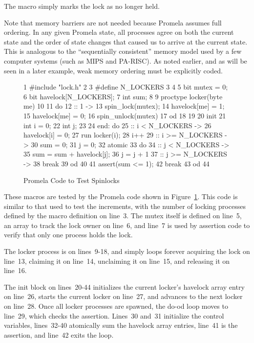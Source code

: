 The  macro simply marks the lock as no
longer held.

Note that memory barriers are not needed because Promela assumes
full ordering.
In any given Promela state, all processes agree on both the current
state and the order of state changes that caused us to arrive at
the current state.
This is analogous to the ``sequentially consistent'' memory model
used by a few computer systems (such as MIPS and PA-RISC).
As noted earlier, and as will be seen in a later example,
weak memory ordering must be explicitly coded.

\begin{figure}[tb]
{ \scriptsize
\begin{verbbox}
  1 #include "lock.h"
  2
  3 #define N_LOCKERS 3
  4
  5 bit mutex = 0;
  6 bit havelock[N_LOCKERS];
  7 int sum;
  8
  9 proctype locker(byte me)
 10 {
 11   do
 12   :: 1 ->
 13     spin_lock(mutex);
 14     havelock[me] = 1;
 15     havelock[me] = 0;
 16     spin_unlock(mutex)
 17   od
 18 }
 19
 20 init {
 21   int i = 0;
 22   int j;
 23
 24 end:  do
 25   :: i < N_LOCKERS ->
 26     havelock[i] = 0;
 27     run locker(i);
 28     i++
 29   :: i >= N_LOCKERS ->
 30     sum = 0;
 31     j = 0;
 32     atomic {
 33       do
 34       :: j < N_LOCKERS ->
 35         sum = sum + havelock[j];
 36         j = j + 1
 37       :: j >= N_LOCKERS ->
 38         break
 39       od
 40     }
 41     assert(sum <= 1);
 42     break
 43   od
 44 }
\end{verbbox}
}
\centering
\theverbbox
\caption{Promela Code to Test Spinlocks}
\label{fig:analysis:Promela Code to Test Spinlocks}
\end{figure}

These macros are tested by the Promela code shown in
Figure~\ref{fig:analysis:Promela Code to Test Spinlocks}.
This code is similar to that used to test the increments,
with the number of locking processes defined by the 
macro definition on line~3.
The mutex itself is defined on line~5, an array to track the lock owner
on line~6, and line~7 is used by assertion
code to verify that only one process holds the lock.

The locker process is on lines~9-18, and simply loops forever
acquiring the lock on line~13, claiming it on line~14,
unclaiming it on line~15, and releasing it on line~16.

The init block on lines~20-44 initializes the current locker's
havelock array entry on line~26, starts the current locker on
line~27, and advances to the next locker on line~28.
Once all locker processes are spawned, the do-od loop
moves to line~29, which checks the assertion.
Lines~30 and~31 initialize the control variables,
lines~32-40 atomically sum the havelock array entries,
line~41 is the assertion, and line~42 exits the loop.

